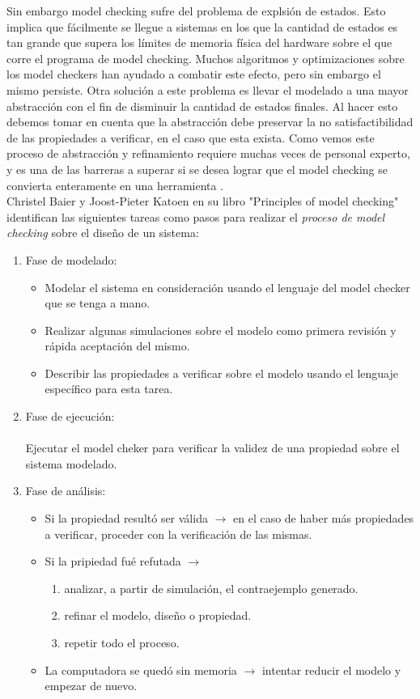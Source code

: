 \documentclass[titlepage, 12pt]{book}
\begin{document}
Sin embargo model checking sufre del problema de explsi\'on de estados. Esto implica que f\'acilmente se llegue a sistemas en los que la cantidad de estados es tan grande que supera los l\'imites de memoria f\'isica del hardware sobre el que corre el programa de model checking. Muchos algoritmos y optimizaciones sobre los model checkers han ayudado a combatir este efecto, pero sin embargo el mismo persiste. Otra soluci\'on a este problema es llevar el modelado a una mayor abstracci\'on con el fin de disminuir la cantidad de estados finales. Al hacer esto debemos tomar en cuenta que la abstracci\'on debe preservar la no satisfactibilidad de las propiedades a verificar, en el caso que esta exista. Como vemos este proceso de abstracci\'on y refinamiento requiere muchas veces de personal experto, y es una de las barreras a superar si se desea lograr que el model checking se convierta enteramente en una herramienta .\\

Christel Baier y Joost-Pieter Katoen en su libro "Principles of model checking" \cite{Baier} identifican las siguientes tareas como pasos para realizar el \textit{proceso de model checking} sobre el dise\~no de un sistema:

\begin{enumerate}
\item Fase de modelado:
\begin{itemize}
\item Modelar el sistema en consideraci\'on usando el lenguaje del model checker que se tenga a mano.
\item Realizar algunas simulaciones sobre el modelo como primera revisi\'on y r\'apida aceptaci\'on del mismo.
\item Describir las propiedades a verificar sobre el modelo usando el lenguaje espec\'ifico para esta tarea.
\end{itemize}
\item Fase de ejecuci\'on:\\\\
Ejecutar el model cheker para verificar la validez de una propiedad sobre el sistema modelado. 
\item Fase de an\'alisis:
\begin{itemize}
\item Si la propiedad result\'o ser v\'alida $\longrightarrow$ en el caso de haber m\'as propiedades a verificar, proceder con la verificaci\'on de las mismas.
\item Si la pripiedad fu\'e refutada $\longrightarrow$
\begin{enumerate}
\item analizar, a partir de simulaci\'on, el contraejemplo generado.
\item refinar el modelo, dise\~no o propiedad.
\item repetir todo el proceso.
\end{enumerate}
\item La computadora se qued\'o sin memoria $\longrightarrow$ intentar reducir el modelo y empezar de nuevo.
\end{itemize}
\end{enumerate}
\end{document}
